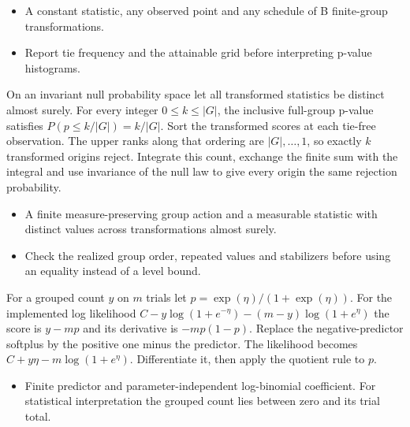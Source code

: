 \expandafter\def\csname statadic@assumptions@STATADIC-RANDOMIZATION-005\endcsname{\begin{itemize}
\item A constant statistic, any observed point and any schedule of B finite-group transformations.
\end{itemize}}
\expandafter\def\csname statadic@diagnostics@STATADIC-RANDOMIZATION-005\endcsname{\begin{itemize}
\item Report tie frequency and the attainable grid before interpreting p-value histograms.
\end{itemize}}
\expandafter\def\csname statadic@statement@STATADIC-RANDOMIZATION-006\endcsname{On an invariant null probability space let all transformed
  statistics be distinct almost surely. For every integer $0\le k\le |G|$,
  the inclusive full-group p-value satisfies $P(p\le k/|G|)=k/|G|$.}
\expandafter\def\csname statadic@proof@STATADIC-RANDOMIZATION-006\endcsname{Sort the transformed scores at each tie-free observation. The upper
  ranks along that ordering are $|G|,\ldots,1$, so exactly $k$ transformed origins
  reject. Integrate this count, exchange the finite sum with the integral and use
  invariance of the null law to give every origin the same rejection probability.}
\expandafter\def\csname statadic@assumptions@STATADIC-RANDOMIZATION-006\endcsname{\begin{itemize}
\item A finite measure-preserving group action and a measurable statistic with distinct values across transformations almost surely.
\end{itemize}}
\expandafter\def\csname statadic@diagnostics@STATADIC-RANDOMIZATION-006\endcsname{\begin{itemize}
\item Check the realized group order, repeated values and stabilizers before using an equality instead of a level bound.
\end{itemize}}
\expandafter\def\csname statadic@statement@STATADIC-GLM-002\endcsname{For a grouped count $y$ on $m$ trials let
  $p=\exp(\eta)/(1+\exp(\eta))$. For the implemented log likelihood
  $C-y\log(1+e^{-\eta})-(m-y)\log(1+e^\eta)$ the score is $y-mp$
  and its derivative is $-mp(1-p)$.}
\expandafter\def\csname statadic@proof@STATADIC-GLM-002\endcsname{Replace the negative-predictor softplus by the positive one
  minus the predictor. The likelihood becomes $C+y\eta-m\log(1+e^\eta)$.
  Differentiate it, then apply the quotient rule to $p$.}
\expandafter\def\csname statadic@assumptions@STATADIC-GLM-002\endcsname{\begin{itemize}
\item Finite predictor and parameter-independent log-binomial coefficient. For statistical interpretation the grouped count lies between zero and its trial total.
\end{itemize}}
